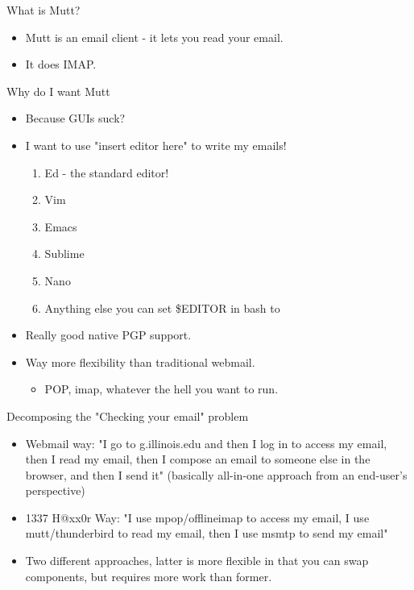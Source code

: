 
\begin{frame}[t,plain]
\titlepage
\end{frame}

\watermarkoff
\begin{frame}[t]{What is Mutt?}
\begin{itemize}
    \item Mutt is an email client - it lets you read your email.
    \item It does IMAP.
\end{itemize}
\end{frame}

\begin{frame}[t]{Why do I want Mutt}
\begin{itemize}
\item Because GUIs suck?
\item I want to use "insert editor here" to write my emails!
    \begin{enumerate}
        \item Ed - the standard editor!
        \item Vim
        \item Emacs
        \item Sublime
        \item Nano
        \item Anything else you can set \$EDITOR in bash to
    \end{enumerate}
\item Really good native PGP support.
\item Way more flexibility than traditional webmail.
    \begin{itemize}
        \item POP, imap, whatever the hell you want to run.
    \end{itemize}
\end{itemize}
\end{frame}

\begin{frame}[t]{Decomposing the "Checking your email" problem}
    \begin{itemize}
\item Webmail way: "I go to g.illinois.edu and then I log in to access my email, then I read my email, then I compose an email to someone else in the browser, and then I send it" (basically all-in-one approach from an end-user's perspective)
\item 1337 H@xx0r Way: "I use mpop/offlineimap to access my email, I use mutt/thunderbird to read my email, then I use msmtp to send my email"
\item Two different approaches, latter is more flexible in that you can swap components, but requires more work than former.
    \end{itemize}
\end{frame}

